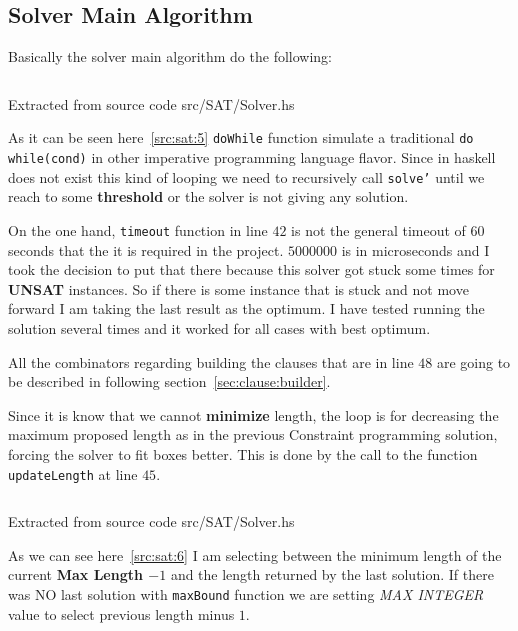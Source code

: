 \documentclass[12pt, a4paper]{article}
\begin{document}
\subsection{Solver Main Algorithm}
Basically the solver main algorithm do the following:

\begin{listing}[H]
  \inputminted[firstline=29, lastline=54, linenos, breaklines]{haskell}{../src/SAT/Solver.hs}
  \caption{Extracted from source code src/SAT/Solver.hs}
  \label{src:sat:5}
\end{listing}

As it can be seen here~\ref{src:sat:5} \texttt{doWhile} function simulate a traditional \texttt{do   while(cond)} in other imperative programming language flavor. Since in \acrshort{haskell} does not exist this kind of looping we need to recursively call \texttt{solve'} until we reach to some \textbf{threshold} or the solver is not giving any solution.

On the one hand, \texttt{timeout} function in line $42$ is not the general timeout of $60$ seconds that the it is required in the project. $5000000$ is in microseconds and I took the decision to put that there because this solver got stuck some times for \textbf{UNSAT} instances. So if there is some instance that is stuck and not move forward I am taking the last result as the optimum. I have tested running the solution several times and it worked for all cases with best optimum.

All the combinators regarding building the clauses that are in line $48$ are going to be described in following section~\ref{sec:clause:builder}.

Since it is know that we cannot \textbf{minimize} length, the loop is for decreasing the maximum proposed length as in the previous Constraint programming solution, forcing the solver to fit boxes better. This is done by the call to the function \texttt{updateLength} at line $45$.

\begin{listing}[H]
  \inputminted[firstline=108, lastline=114, linenos, breaklines]{haskell}{../src/SAT/Solver.hs}
  \caption{Extracted from source code src/SAT/Solver.hs}
  \label{src:sat:6}
\end{listing}

As we can see here~\ref{src:sat:6} I am selecting between the minimum length of the current \textbf{Max Length $-1$} and the length returned by the last solution. If there was NO last solution with \texttt{maxBound} function we are setting \textit{MAX INTEGER} value to select previous length minus $1$.
\end{document}
